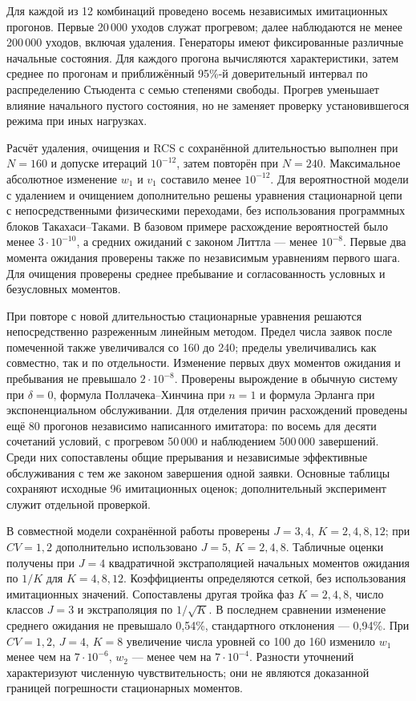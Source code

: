 Для каждой из 12 комбинаций проведено восемь независимых имитационных прогонов. Первые 20\,000 уходов служат прогревом; далее наблюдаются не менее 200\,000 уходов, включая удаления. Генераторы имеют фиксированные различные начальные состояния. Для каждого прогона вычисляются характеристики, затем среднее по прогонам и приближённый 95\%-й доверительный интервал по распределению Стьюдента с семью степенями свободы. Прогрев уменьшает влияние начального пустого состояния, но не заменяет проверку установившегося режима при иных нагрузках.

Расчёт удаления, очищения и RCS с сохранённой длительностью выполнен при \(N=160\) и допуске итераций \(10^{-12}\), затем повторён при \(N=240\). Максимальное абсолютное изменение \(w_1\) и \(v_1\) составило менее \(10^{-12}\). Для вероятностной модели с удалением и очищением дополнительно решены уравнения стационарной цепи с непосредственными физическими переходами, без использования программных блоков Такахаси--Таками. В базовом примере расхождение вероятностей было менее \(3\cdot10^{-10}\), а средних ожиданий с законом Литтла --- менее \(10^{-8}\). Первые два момента ожидания проверены также по независимым уравнениям первого шага. Для очищения проверены среднее пребывание и согласованность условных и безусловных моментов.

При повторе с новой длительностью стационарные уравнения решаются непосредственно разреженным линейным методом. Предел числа заявок после помеченной также увеличивался со 160 до 240; пределы увеличивались как совместно, так и по отдельности. Изменение первых двух моментов ожидания и пребывания не превышало \(2\cdot10^{-8}\). Проверены вырождение в обычную систему при \(\delta=0\), формула Поллачека--Хинчина при \(n=1\) и формула Эрланга при экспоненциальном обслуживании. Для отделения причин расхождений проведены ещё 80 прогонов независимо написанного имитатора: по восемь для десяти сочетаний условий, с прогревом 50\,000 и наблюдением 500\,000 завершений. Среди них сопоставлены общие прерывания и независимые эффективные обслуживания с тем же законом завершения одной заявки. Основные таблицы сохраняют исходные 96 имитационных оценок; дополнительный эксперимент служит отдельной проверкой.

В совместной модели сохранённой работы проверены \(J=3,4\), \(K=2,4,8,12\); при \(CV=1{,}2\) дополнительно использовано \(J=5\), \(K=2,4,8\). Табличные оценки получены при \(J=4\) квадратичной экстраполяцией начальных моментов ожидания по \(1/K\) для \(K=4,8,12\). Коэффициенты определяются сеткой, без использования имитационных значений. Сопоставлены другая тройка фаз \(K=2,4,8\), число классов \(J=3\) и экстраполяция по \(1/\sqrt K\). В последнем сравнении изменение среднего ожидания не превышало 0{,}54\%, стандартного отклонения --- 0{,}94\%. При \(CV=1{,}2\), \(J=4\), \(K=8\) увеличение числа уровней со 100 до 160 изменило \(w_1\) менее чем на \(7\cdot10^{-6}\), \(w_2\) --- менее чем на \(7\cdot10^{-4}\). Разности уточнений характеризуют численную чувствительность; они не являются доказанной границей погрешности стационарных моментов.

